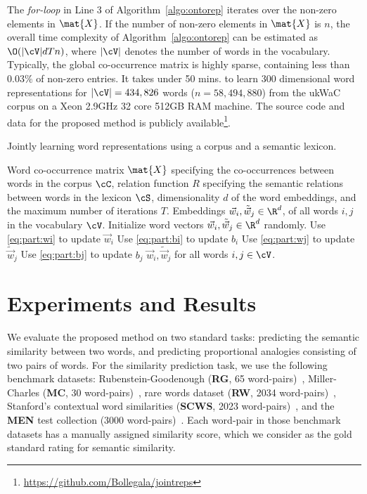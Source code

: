 \documentclass[letterpaper]{article}
\newcommand{\citep}{\cite}
\begin{document}
The \emph{for-loop} in Line 3 of Algorithm~\ref{algo:ontorep} iterates over the non-zero
elements in $\mat{X}$. If the number of non-zero elements in $\mat{X}$ is $n$, the overall time complexity
of Algorithm~\ref{algo:ontorep} can be estimated as $\O(|\cV|dTn)$, where $|\cV|$ denotes the number of words
in the vocabulary. 
Typically, the global co-occurrence matrix is highly sparse, containing less than $0.03\%$ of non-zero entries.
It takes under 50 mins. to learn $300$ dimensional word representations for $|\cV| = 434,826$ words 
($n = 58,494,880$) from the ukWaC corpus
on a Xeon 2.9GHz 32 core 512GB RAM machine. 
The source code and data for the proposed method is publicly available\footnote{\url{https://github.com/Bollegala/jointreps}}.

\begin{algorithm}[t]     
\small  
\caption{Jointly learning word representations using a corpus and a semantic lexicon.}        
\label{algo:ontorep}                         
\begin{algorithmic}[1]         
\REQUIRE Word co-occurrence matrix $\mat{X}$ specifying the co-occurrences between words in the corpus $\cC$, 
		relation function $R$ specifying the semantic relations between words in the lexicon $\cS$, 
		dimensionality $d$ of the word embeddings, and the maximum number of iterations $T$.
\ENSURE Embeddings $\vec{w}_i, \tilde{\vec{w}}_j \in \R^d$, of all words $i, j$ in the vocabulary $\cV$.
\medskip
\STATE Initialize word vectors $\vec{w}_i, \tilde{\vec{w}}_j \in \R^d$ randomly. \label{line:init}
		\STATE Use \eqref{eq:part:wi} to update $\vec{w}_i$
		\STATE Use \eqref{eq:part:bi} to update $b_i$
		\STATE Use \eqref{eq:part:wj} to update $\tilde{\vec{w}}_j$
		\STATE Use \eqref{eq:part:bj} to update $b_j$
	\ENDFOR 
\ENDFOR 
\RETURN $\vec{w}_i, \tilde{\vec{w}}_j$ for all words $i,j \in \cV$.
\end{algorithmic}
\end{algorithm}

\section{Experiments and Results}
\label{sec:exp}


We evaluate the proposed method on two standard tasks: predicting the semantic similarity between two words,
and predicting proportional analogies consisting of two pairs of words.
For the similarity prediction task, we use the following benchmark datasets: Rubenstein-Goodenough (\textbf{RG}, 65 word-pairs)~\citep{RG},
Miller-Charles (\textbf{MC}, 30 word-pairs)~\citep{MC}, rare words dataset (\textbf{RW}, 2034 word-pairs)~\citep{Luong:CoNLL:2013},
Stanford's contextual word similarities (\textbf{SCWS}, 2023 word-pairs)~\citep{Huang:ACL:2012}, 
and the \textbf{MEN} test collection (3000 word-pairs)~\citep{MEN}.
Each word-pair in those benchmark datasets has a manually assigned similarity score,
 which we consider as the gold standard rating for semantic similarity.  
\end{document}
